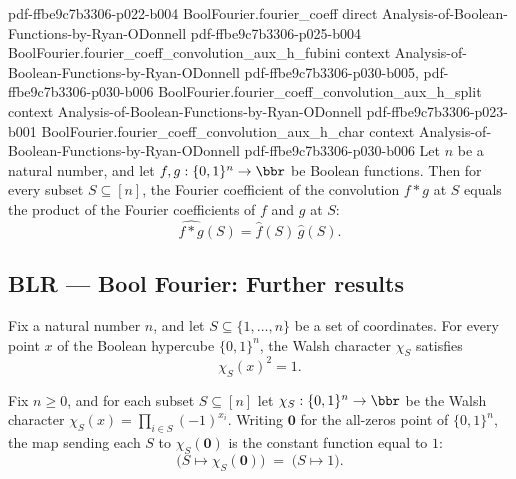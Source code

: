 \begin{lemma}
{    pdf-ffbe9c7b3306-p022-b004}
\proofstep
  {BoolFourier.fourier_coeff}
  {direct}
  {Analysis-of-Boolean-Functions-by-Ryan-ODonnell}
  {pdf-ffbe9c7b3306-p025-b004}
\proofstep
  {BoolFourier.fourier_coeff_convolution_aux_h_fubini}
  {context}
  {Analysis-of-Boolean-Functions-by-Ryan-ODonnell}
  {pdf-ffbe9c7b3306-p030-b005,
    pdf-ffbe9c7b3306-p030-b006}
\proofstep
  {BoolFourier.fourier_coeff_convolution_aux_h_split}
  {context}
  {Analysis-of-Boolean-Functions-by-Ryan-ODonnell}
  {pdf-ffbe9c7b3306-p023-b001}
\proofstep
  {BoolFourier.fourier_coeff_convolution_aux_h_char}
  {context}
  {Analysis-of-Boolean-Functions-by-Ryan-ODonnell}
  {pdf-ffbe9c7b3306-p030-b006}
Let $n$ be a natural number, and let $f, g : \{0,1\}^n \to \bbr$ be Boolean functions.
Then for every subset $S \subseteq [n]$, the Fourier coefficient of the convolution $f *
g$ at $S$ equals the product of the Fourier coefficients of $f$ and $g$ at $S$:
\[
  \widehat{f * g}(S) = \hat f(S)\,\hat g(S).
\]
\end{lemma}

\subsection*{BLR --- Bool Fourier: Further results}

\begin{lemma}
\label{BoolFourier.char_S_sq_aux_h}
\leanok
{}
Fix a natural number $n$, and let $S \subseteq \{1,\dots,n\}$ be a set of coordinates.
For every point $x$ of the Boolean hypercube $\{0,1\}^n$, the Walsh character $\chi_S$
satisfies
\[
\chi_S(x)^2 = 1.
\]
\end{lemma}

\begin{lemma}
\label{BoolFourier.sum_char_S_at_zero_aux_h}
\leanok
{}
Fix $n \ge 0$, and for each subset $S \subseteq [n]$ let $\chi_S : \{0,1\}^n \to \bbr$
be the Walsh character $\chi_S(x) = \prod_{i \in S}(-1)^{x_i}$. Writing $\mathbf{0}$ for
the all-zeros point of $\{0,1\}^n$, the map sending each $S$ to $\chi_S(\mathbf{0})$ is
the constant function equal to $1$:
\[
  \bigl(S \mapsto \chi_S(\mathbf{0})\bigr) \;=\; \bigl(S \mapsto 1\bigr).
\]
\end{lemma}

